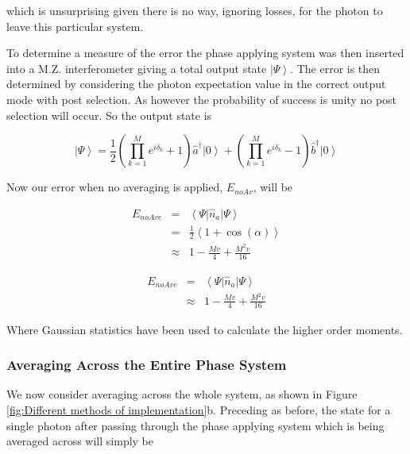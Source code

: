 \documentclass[aps,pra,twocolumn,superscriptaddress,numerical]{revtex4-1}
\begin{document}
		
		which is unsurprising given there is no way, ignoring losses, for the photon to leave this particular system.
		
		To determine a measure of the error the phase applying system was then inserted into a M.Z. interferometer giving a total output state $\left|\Psi\right\rangle $. The error is then determined by considering the photon expectation value in the correct output mode with post selection. As however the probability of success is unity no post selection will occur. So the output state is
		
		\begin{equation}
		\left|\Psi\right\rangle 	=\frac{1}{2}\left(\prod_{k=1}^{M}e^{i\delta_{k}}+1\right)\hat{a}^{\dagger}\left|0\right\rangle +\left(\prod_{k=1}^{M}e^{i\delta_{k}}-1\right)\hat{b}^{\dagger}\left|0\right\rangle \label{eq:noAveIntState}
		\end{equation}
		
		
		Now our error when no averaging is applied, $E_{noAv}$, will be
		
		\begin{eqnarray}
		E_{noAve} & = & \left\langle \Psi\right|\hat{n}_{a}\left|\Psi\right\rangle \nonumber \\
		& = & \frac{1}{2}\left\langle 1+\cos\left(\alpha\right)\right\rangle \nonumber \\
		& \approx & 1-\frac{Mv}{4}+\frac{M^{2}v}{16}\label{eq:ErrorNoAv1}
		\end{eqnarray}
		
		
		\begin{eqnarray}
		E_{noAve} & = & \left\langle \Psi\right|\hat{n}_{a}\left|\Psi\right\rangle \nonumber \\
		& \approx & 1-\frac{Mv}{4}+\frac{M^{2}v}{16}\label{eq:ErrorNoAv}
		\end{eqnarray}
		
		Where Gaussian statistics have been used to calculate the higher order moments.
		
		
		\subsubsection{Averaging Across the Entire Phase System\label{Averaging Across the Entire Phase System}}
		
		We now consider averaging across the whole system, as shown in Figure  \ref{fig:Different methods of implementation}b. Preceding as before, the state for a single photon after passing through the phase applying system which is being averaged across will simply be
		
\end{document}
